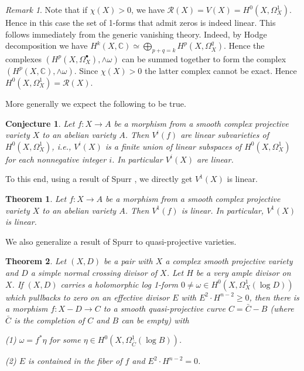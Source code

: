\documentclass[11pt,reqno]{amsart}
\newtheorem{conjecture}[theorem]{Conjecture}
\newtheorem{alphtheorem}{Theorem}
\theoremstyle{definition}
\theoremstyle{remark}
\newtheorem{remark}[theorem]{Remark}
\theoremstyle{cited}
\theoremstyle{citeddef}
\newcommand{\sR}{\mathcal{R}}
\newcommand{\bbC}{\mathbb{C}}
\begin{document}
\begin{remark}
Note that if $\chi(X)>0$, we have $\sR(X) = V(X) = H^0(X, \Omega_X^1)$. Hence in this case the set of 1-forms that admit zeros is indeed linear. 
This follows immediately from the generic vanishing theory. Indeed, by Hodge decomposition
we have
$H^k(X,\bbC) \simeq \bigoplus_{p+q = k} H^p(X,\Omega_X^q)$. Hence the complexes $(H^p(X, \Omega_X^{\bullet}), \wedge\omega)$ can be summed together to form the complex $(H^p(X, \bbC), \wedge\omega)$. Since $\chi(X)>0$ the latter complex cannot be exact. Hence $H^0(X,\Omega_X^1)
= \sR(X)$.
\end{remark}




More generally we expect the following to be true.
\begin{conjecture} \label{linear-v1}
Let $f: X\to A$ be a morphism from a smooth complex projective variety $X$ to an abelian variety $A$. Then $V^i(f)$ are linear subvarieties of $H^0(X, \Omega_X^1)$, i.e., $V^i(X)$ is a finite union of linear subspaces of $H^0(X, \Omega_X^1)$ for each nonnegative integer $i$. In particular $V^i(X)$ are linear.
\end{conjecture}

To this end, using a result of Spurr \cite{Sp88}, we directly get $V^1(X)$ is linear.

\begin{alphtheorem}
Let $f: X\to A$ be a morphism from a smooth complex projective variety $X$ to an abelian variety $A$. Then $V^1(f)$ is linear. In particular, $V^1(X)$ is linear.
\end{alphtheorem}


We also generalize a result of Spurr \cite{Sp88} to quasi-projective varieties. 

\begin{alphtheorem} \label{log-linear-v1}
Let $(X, D)$ be a pair with $X$ a complex smooth projective variety and $D$ a simple normal crossing divisor of $X$. Let $H$ be a very ample divisor on $X$. If $(X, D)$ carries a holomorphic log 1-form $0\not=\omega\in H^0(X, \Omega_X^1(\log D))$  which pullbacks to zero on an effective divisor $E$ with $E^2\cdot H^{n-2}\geq0$, then there is a morphism $f: X-D\to C$ to a smooth quasi-projective curve $C=\bar{C}-B$ (where $\bar{C}$ is the completion of $C$ and $B$ can be empty) with 

(1)  $\omega=f^*\eta$ for some $\eta\in H^0(X, \Omega_{\bar{C}}^1(\log B))$.

(2) $E$ is contained in the fiber of $f$ and $E^2\cdot H^{n-2}=0$.
\end{alphtheorem}
\end{document}
